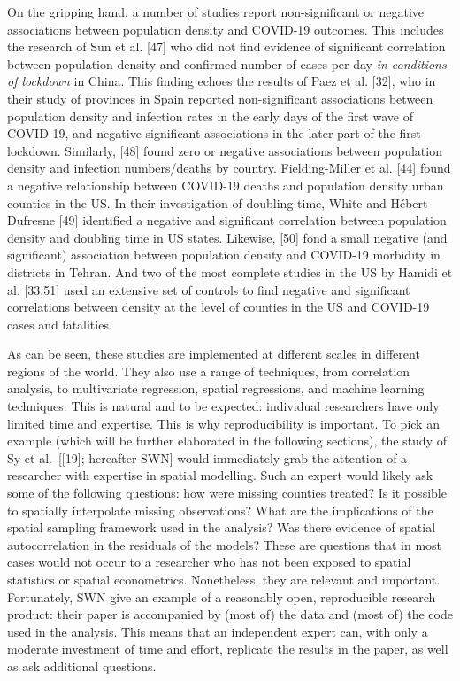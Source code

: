 \documentclass[10pt,letterpaper]{article}
\begin{document}
On the gripping hand, a number of studies report non-significant or
negative associations between population density and COVID-19 outcomes.
This includes the research of Sun et al. {[}47{]} who did not find
evidence of significant correlation between population density and
confirmed number of cases per day \emph{in conditions of lockdown} in
China. This finding echoes the results of Paez et al. {[}32{]}, who in
their study of provinces in Spain reported non-significant associations
between population density and infection rates in the early days of the
first wave of COVID-19, and negative significant associations in the
later part of the first lockdown. Similarly, {[}48{]} found zero or
negative associations between population density and infection
numbers/deaths by country. Fielding-Miller et al. {[}44{]} found a
negative relationship between COVID-19 deaths and population density
urban counties in the US. In their investigation of doubling time, White
and Hébert-Dufresne {[}49{]} identified a negative and significant
correlation between population density and doubling time in US states.
Likewise, {[}50{]} fond a small negative (and significant) association
between population density and COVID-19 morbidity in districts in
Tehran. And two of the most complete studies in the US by Hamidi et al.
{[}33,51{]} used an extensive set of controls to find negative and
significant correlations between density at the level of counties in the
US and COVID-19 cases and fatalities.

As can be seen, these studies are implemented at different scales in
different regions of the world. They also use a range of techniques,
from correlation analysis, to multivariate regression, spatial
regressions, and machine learning techniques. This is natural and to be
expected: individual researchers have only limited time and expertise.
This is why reproducibility is important. To pick an example (which will
be further elaborated in the following sections), the study of Sy et
al.~{[}{[}19{]}; hereafter SWN{]} would immediately grab the attention
of a researcher with expertise in spatial modelling. Such an expert
would likely ask some of the following questions: how were missing
counties treated? Is it possible to spatially interpolate missing
observations? What are the implications of the spatial sampling
framework used in the analysis? Was there evidence of spatial
autocorrelation in the residuals of the models? These are questions that
in most cases would not occur to a researcher who has not been exposed
to spatial statistics or spatial econometrics. Nonetheless, they are
relevant and important. Fortunately, SWN give an example of a reasonably
open, reproducible research product: their paper is accompanied by (most
of) the data and (most of) the code used in the analysis. This means
that an independent expert can, with only a moderate investment of time
and effort, replicate the results in the paper, as well as ask
additional questions.
\end{document}
